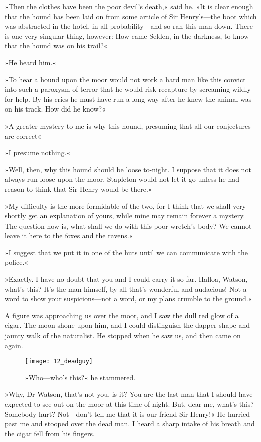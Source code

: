 »Then the clothes have been the poor devil's death,« said he. »It is clear enough that the hound has been laid on from some article of Sir Henry's\allowbreak---\allowbreak the boot which was abstracted in the hotel, in all probability\allowbreak---\allowbreak and so ran this man down. There is one very singular thing, however: How came Selden, in the darkness, to know that the hound was on his trail?«

»He heard him.«

»To hear a hound upon the moor would not work a hard man like this convict into such a paroxysm of terror that he would risk recapture by screaming wildly for help. By his cries he must have run a long way after he knew the animal was on his track. How did he know?«

»A greater mystery to me is why this hound, presuming that all our conjectures are correct\longdash «

»I presume nothing.«

»Well, then, why this hound should be loose to-night. I suppose that it does not always run loose upon the moor. Stapleton would not let it go unless he had reason to think that Sir Henry would be there.«

»My difficulty is the more formidable of the two, for I think that we shall very shortly get an explanation of yours, while mine may remain forever a mystery. The question now is, what shall we do with this poor wretch's body? We cannot leave it here to the foxes and the ravens.«

»I suggest that we put it in one of the huts until we can communicate with the police.«

»Exactly. I have no doubt that you and I could carry it so far. Halloa, Watson, what's this? It's the man himself, by all that's wonderful and audacious! Not a word to show your suspicions\allowbreak---\allowbreak not a word, or my plans crumble to the ground.«

A figure was approaching us over the moor, and I saw the dull red glow of a cigar. The moon shone upon him, and I could distinguish the dapper shape and jaunty walk of the naturalist. He stopped when he saw us, and then came on again.

\begin{figure}[tbph]
\centering
\texttt{[image: 12\_deadguy]}
\caption{»Who—who's this?« he stammered.}
\end{figure}

»Why, Dr Watson, that's not you, is it? You are the last man that I should have expected to see out on the moor at this time of night. But, dear me, what's this? Somebody hurt? Not\allowbreak---\allowbreak don't tell me that it is our friend Sir Henry!« He hurried past me and stooped over the dead man. I heard a sharp intake of his breath and the cigar fell from his fingers.


